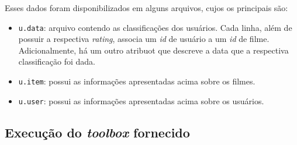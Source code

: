 \vspace{12pt}

Esses dados foram disponibilizados em alguns arquivos, cujos os principais são:

\begin{itemize}
  \item \texttt{u.data}: arquivo contendo as classificações dos usuários. Cada
  linha, além de possuir a respectiva \textit{rating}, associa um \textit{id} de
  usuário a um \textit{id} de filme. Adicionalmente, há um outro atribuot que
  descreve a data que a respectiva classificação foi dada.

  \item \texttt{u.item}: possui as informações apresentadas acima sobre os
  filmes.
  
  \item \texttt{u.user}: possui as informações apresentadas acima sobre os
  usuários.
  
\end{itemize}

\subsection{Execução do \textit{toolbox} fornecido}
